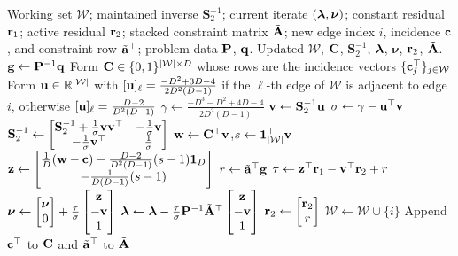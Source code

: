 \begin{algorithm}[H]
	\caption{Active-set KKT update when adding an edge}
	\label{alg:active_set_add_edge}
	\begin{algorithmic}[1]
		\renewcommand{\algorithmicrequire}{\textbf{Input:}}
		\renewcommand{\algorithmicensure}{\textbf{Output:}}
		\Require Working set $\mathcal{W}$; maintained inverse $\mathbf{S}_2^{-1}$; current iterate $(\lh,\boldsymbol{\nu})$; constant residual $\r_1$; active residual $\r_2$; stacked constraint matrix $\tilde{\A}$; new edge index $i$, incidence $\c$, and constraint row $\tilde{\a}^\top$; problem data $\P$, $\q$.
		\Ensure Updated $\mathcal{W}$, $\C$, $\mathbf{S}_2^{-1}$, $\lh$, $\boldsymbol{\nu}$, $\r_2$, $\tilde{\A}$.
		\State $\g\gets\P^{-1}\q$
		\State Form $\C\in\{0,1\}^{|\mathcal{W}|\times D}$ whose rows are the incidence vectors $\{\c_j^\top\}_{j\in\mathcal{W}}$
		\State Form $\u\in\mathbb{R}^{|\mathcal{W}|}$ with
		\Statex \quad $[\u]_\ell=\frac{-D^2+3D-4}{2D^2(D-1)}$ if the $\ell$-th edge of $\mathcal{W}$ is adjacent to edge $i$, otherwise $[\u]_\ell=\frac{D-2}{D^2(D-1)}$
		\State $\gamma\gets\frac{-D^3-D^2+4D-4}{2D^2(D-1)}$
		\State $\v\gets\mathbf{S}_2^{-1}\u$
		\State $\sigma\gets\gamma-\u^\top\v$
		\State $\mathbf{S}_2^{-1}\gets\begin{bmatrix}\mathbf{S}_2^{-1}+\frac{1}{\sigma}\v\v^\top & -\frac{1}{\sigma}\v\\ -\frac{1}{\sigma}\v^\top & \frac{1}{\sigma}\end{bmatrix}$
		\State $\w\gets\C^\top\v$,\quad $s\gets\mathbf{1}_{|\mathcal{W}|}^\top\v$
		\State $\z\gets\begin{bmatrix}\frac{1}{D}(\w-\c)-\frac{D-2}{D^2(D-1)}(s-1)\mathbf{1}_D\\ -\frac{1}{D(D-1)}(s-1)\end{bmatrix}$
		\State $r\gets\tilde{\a}^\top\g$
		\State $\tau\gets\z^\top\r_1-\v^\top\r_2+r$
		\State $\boldsymbol{\nu}\gets\begin{bmatrix}\boldsymbol{\nu}\\0\end{bmatrix}+\frac{\tau}{\sigma}\begin{bmatrix}\z\\-\v\\1\end{bmatrix}$
		\State $\lh\gets\lh-\frac{\tau}{\sigma}\P^{-1}\tilde{\A}^\top\begin{bmatrix}\z\\-\v\\1\end{bmatrix}$
		\State $\r_2\gets\begin{bmatrix}\r_2\\r\end{bmatrix}$
		\State $\mathcal{W}\gets\mathcal{W}\cup\{i\}$
		\State Append $\c^\top$ to $\C$ and $\tilde{\a}^\top$ to $\tilde{\A}$
	\end{algorithmic}
\end{algorithm}

